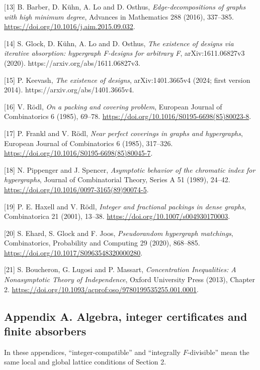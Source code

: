 \documentclass[english,11pt,a4paper]{article}
\begin{document}
{[}13{]} B. Barber, D. Kühn, A. Lo and D. Osthus, \emph{Edge-decompositions of graphs with high minimum degree}, Advances in Mathematics 288 (2016), 337--385. \url{https://doi.org/10.1016/j.aim.2015.09.032}.

{[}14{]} S. Glock, D. Kühn, A. Lo and D. Osthus, \emph{The existence of designs via iterative absorption: hypergraph F-designs for arbitrary F}, arXiv:1611.06827v3 (2020). https://arxiv.org/abs/1611.06827v3.

{[}15{]} P. Keevash, \emph{The existence of designs}, arXiv:1401.3665v4 (2024; first version 2014). https://arxiv.org/abs/1401.3665v4.

{[}16{]} V. Rödl, \emph{On a packing and covering problem}, European Journal of Combinatorics 6 (1985), 69--78. \url{https://doi.org/10.1016/S0195-6698(85)80023-8}.

{[}17{]} P. Frankl and V. Rödl, \emph{Near perfect coverings in graphs and hypergraphs}, European Journal of Combinatorics 6 (1985), 317--326. \url{https://doi.org/10.1016/S0195-6698(85)80045-7}.

{[}18{]} N. Pippenger and J. Spencer, \emph{Asymptotic behavior of the chromatic index for hypergraphs}, Journal of Combinatorial Theory, Series A 51 (1989), 24--42. \url{https://doi.org/10.1016/0097-3165(89)90074-5}.

{[}19{]} P. E. Haxell and V. Rödl, \emph{Integer and fractional packings in dense graphs}, Combinatorica 21 (2001), 13--38. \url{https://doi.org/10.1007/s004930170003}.

{[}20{]} S. Ehard, S. Glock and F. Joos, \emph{Pseudorandom hypergraph matchings}, Combinatorics, Probability and Computing 29 (2020), 868--885. \url{https://doi.org/10.1017/S0963548320000280}.

{[}21{]} S. Boucheron, G. Lugosi and P. Massart, \emph{Concentration Inequalities: A Nonasymptotic Theory of Independence}, Oxford University Press (2013), Chapter 2. \url{https://doi.org/10.1093/acprof:oso/9780199535255.001.0001}.

\endgroup
\clearpage

\subsection{Appendix A. Algebra, integer certificates and finite absorbers}\label{appendix-a.-algebra-integer-certificates-and-finite-absorbers}

In these appendices, ``integer-compatible'' and ``integrally \(F\)-divisible'' mean the same local and global lattice conditions of Section 2.
\end{document}

